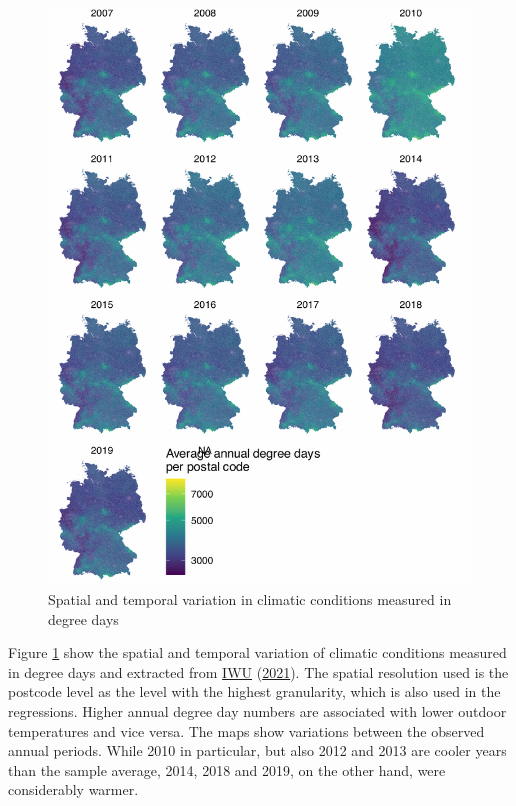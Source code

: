 \documentclass[12pt,twoside]{reedthesis}
\begin{document}
\newpage
\begin{figure}

{\centering \includegraphics[width=0.77\linewidth]{figure/distribution_degree_days} 

}

\caption{Spatial and temporal variation in climatic conditions measured in degree days}\label{fig:degree-days-distribution}
\end{figure}
Figure \ref{fig:degree-days-distribution} show the spatial and temporal variation of climatic conditions measured in degree days and extracted from \protect\hyperlink{ref-iwu21}{IWU} (\protect\hyperlink{ref-iwu21}{2021}). The spatial resolution used is the postcode level as the level with the highest granularity, which is also used in the regressions. Higher annual degree day numbers are associated with lower outdoor temperatures and vice versa. The maps show variations between the observed annual periods. While 2010 in particular, but also 2012 and 2013 are cooler years than the sample average, 2014, 2018 and 2019, on the other hand, were considerably warmer.
\end{document}
